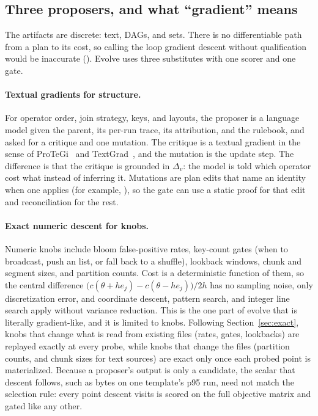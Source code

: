 \subsection{Three proposers, and what ``gradient'' means}\label{sec:proposers}

The artifacts are discrete: text, DAGs, and sets. There is no differentiable
path from a plan to its cost, so calling the loop gradient descent without
qualification would be inaccurate (). Evolve uses three substitutes
with one scorer and one gate.

\paragraph{Textual gradients for structure.} For operator order, join strategy,
keys, and layouts, the proposer is a language model given the parent, its
per-run trace, its attribution, and the rulebook, and asked for a critique and
one mutation. The critique is a textual gradient in the sense of
ProTeGi~\cite{protegi} and TextGrad~\cite{textgrad}, and the mutation is the
update step. The difference is that the critique is grounded in $\Delta_v$: the
model is told which operator cost what instead of inferring it. Mutations are
plan edits that name an identity when one applies (for example,
), so the gate can use a static proof for that
edit and reconciliation for the rest.

\paragraph{Exact numeric descent for knobs.} Numeric knobs include bloom
false-positive rates, key-count gates (when to broadcast, push an 
list, or fall back to a shuffle), lookback windows, chunk and segment sizes, and
partition counts. Cost is a deterministic function of them, so the central
difference $\big(c(\theta + h e_j) - c(\theta - h e_j)\big)/2h$ has no
sampling noise, only discretization error, and coordinate descent, pattern
search, and integer line search apply without variance reduction. This is the
one part of evolve that is literally gradient-like, and it is limited to knobs.
Following Section~\ref{sec:exact}, knobs that change what is read from existing
files (rates, gates, lookbacks) are replayed exactly at every probe, while knobs
that change the files (partition counts, and chunk sizes for text sources) are
exact only once each probed point is materialized. Because a proposer's output
is only a candidate, the scalar that descent follows, such as bytes on one
template's p95 run, need not match the selection rule: every point descent
visits is scored on the full objective matrix and gated like any other.

